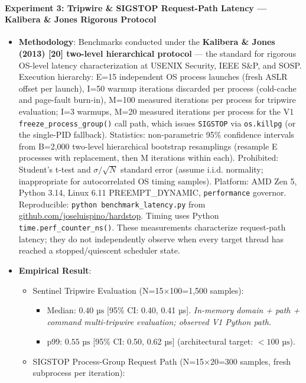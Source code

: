 \documentclass[
  10pt,letterpaper]{article}
\providecommand{\tightlist}{%
  \setlength{\itemsep}{0pt}\setlength{\parskip}{0pt}}
\begin{document}
\paragraph{Experiment 3: Tripwire \& SIGSTOP Request-Path Latency --- Kalibera
\& Jones Rigorous
Protocol}\label{experiment-3-preemption-latency-wcet-profile-kalibera-jones-rigorous-protocol}

\begin{itemize}
\tightlist
\item
  \textbf{Methodology}: Benchmarks conducted under the \textbf{Kalibera
  \& Jones (2013) {[}20{]} two-level hierarchical protocol} --- the
  standard for rigorous OS-level latency characterization at USENIX
  Security, IEEE S\&P, and SOSP. Execution hierarchy: E=15 independent
  OS process launches (fresh ASLR offset per launch), I=50 warmup
  iterations discarded per process (cold-cache and page-fault burn-in),
  M=100 measured iterations per process for tripwire evaluation; I=3
  warmups, M=20 measured iterations per process for the V1
  \texttt{freeze\_process\_group()} call path, which issues
  \texttt{SIGSTOP} via \texttt{os.killpg} (or the single-PID fallback). Statistics: non-parametric 95\% confidence intervals from
  B=2,000 two-level hierarchical bootstrap resamplings (resample E
  processes with replacement, then M iterations within each).
  Prohibited: Student's t-test and \(\sigma/\sqrt{N}\) standard error
  (assume i.i.d. normality; inappropriate for autocorrelated OS timing
  samples). Platform: AMD Zen 5, Python 3.14, Linux 6.11
  PREEMPT\_DYNAMIC, \texttt{performance} governor. Reproducible:
  \texttt{python\ benchmark\_latency.py} from
  \href{https://github.com/joseluispino/hardstop}{github.com/joseluispino/hardstop}.
  Timing uses Python \texttt{time.perf\_counter\_ns()}. These measurements
  characterize request-path latency; they do not independently observe when
  every target thread has reached a stopped/quiescent scheduler state.
\item
  \textbf{Empirical Result}:

  \begin{itemize}
  \tightlist
  \item
    Sentinel Tripwire Evaluation (N=15×100=1,500 samples):

    \begin{itemize}
    \tightlist
    \item
      Median: \textbf{\(0.40\text{ µs}\)} {[}95\% CI: 0.40, 0.41 µs{]}.
      \emph{In-memory domain + path + command multi-tripwire evaluation;
      observed V1 Python path.}
    \item
      p99: \textbf{\(0.55\text{ µs}\)} {[}95\% CI: 0.50, 0.62 µs{]}
      (architectural target: \(< 100\text{ µs}\)).
    \end{itemize}
  \item
    SIGSTOP Process-Group Request Path (N=15×20=300 samples, fresh
    subprocess per iteration):


\end{itemize}
\end{itemize}
\end{document}

